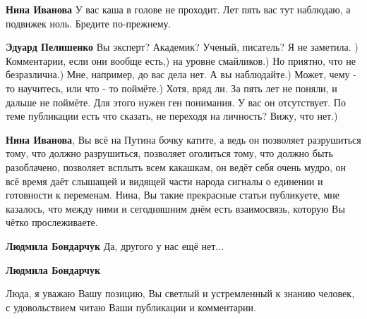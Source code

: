 \begin{itemize}
\begin{itemize}
\textbf{Нина Иванова} У вас каша в голове не проходит. Лет пять вас тут наблюдаю, а подвижек ноль. Бредите по-прежнему.

 
\textbf{Эдуард Пелишенко} Вы эксперт? Академик? Ученый, писатель? Я не заметила. ) Комментарии, если они вообще есть,) на уровне смайликов.) Но приятно, что не безразлична.) Мне, например, до вас дела нет. А вы наблюдайте.) Может, чему - то научитесь, или что - то поймёте.) Хотя, вряд ли. За пять лет не поняли, и дальше не поймёте. Для этого нужен ген понимания. У вас он отсутствует. По теме публикации есть что сказать, не переходя на личность? Вижу, что нет.)

 
\textbf{Нина Иванова}, Вы всё на Путина бочку катите, а ведь он позволяет разрушиться тому, что должно разрушиться, позволяет оголиться тому, что должно быть разоблачено, позволяет всплыть всем какашкам, он ведёт себя очень мудро, он всё время даёт слышащей и видящей части народа сигналы о единении и готовности к переменам. Нина, Вы такие прекрасные статьи публикуете, мне казалось, что между ними и сегодняшним днём есть взаимосвязь, которую Вы чётко прослеживаете.

 
\textbf{Людмила Бондарчук} Да, другого у нас ещё нет...

 
\textbf{Людмила Бондарчук} 

Люда, я уважаю Вашу позицию, Вы светлый и устремленный к знанию человек, с удовольствием читаю Ваши публикации и комментарии.


\end{itemize}
\end{itemize}
